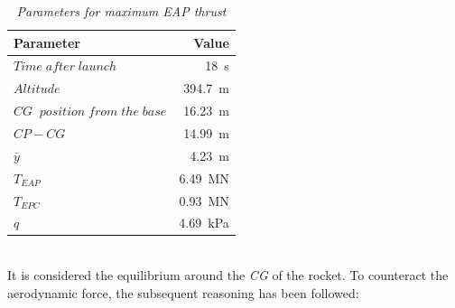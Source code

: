 \documentclass[12pt,fleqn,openany]{book} %
\begin{document}
\begin{table}[h]
	\centering
	\begin{tabular}{ l r }
\toprule
Parameter					&Value 				\\
\midrule                                                                                                             
$Time\; after\; launch$			&\SI{18}{s}			\\
$Altitude$					&\SI{394.7}{m}      \\
$CG\;\; position\; from\; the\; base$	&\SI{16.23}{m}    \\
$CP-CG $				&\SI{14.99}{m}    \\
$\bar{y}$ 					&\SI{4.23}{m}      \\
$T_{EAP}$						&\SI{6.49}{MN}     \\
$T_{EPC}$						&\SI{0.93}{MN}    \\
$q$							&\SI{4.69}{kPa}    \\
\bottomrule
\end{tabular} 
\caption{\emph{Parameters for maximum EAP thrust}}        
\label{tab:maxEAPpar}                       
\end{table}\\
It is considered the equilibrium around the \textit{CG} of the rocket. To counteract the aerodynamic force, the subsequent reasoning has been followed: 
\end{document}
